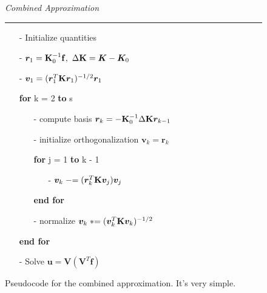 \begin{minipage}[t]{0.7\textwidth}
\begin{figure}[H]
\begin{framed}
    \textit{Combined Approximation}
    \hrule
    \begin{itemize}
        \item[-] Initialize quantities
        \item[-] $\bm r_1 = \mathbf{K}^{-1}_0\mathbf{f}, \ \Delta\mathbf{K} = \bm K - \bm K_0$
        \item[-] $\bm v_1 = (\bm r_1^T\mathbf{K} \bm r_1)^{-1/2}\bm r_1$
        \item[] \textbf{for} k = 2 \textbf{to} s
        \begin{itemize}
            \item[-] compute basis $\bm r_k = -\mathbf{K}^{-1}_0 \Delta\mathbf{K} \bm r_{k - 1}$
            \item[-] initialize orthogonalization $\bm v_k = \bm r_k$
            \item[] \textbf{for} j = 1 \textbf{to} k - 1
            \begin{itemize}
                \item[-] $\bm v_k \mathrel{-}= (\bm r_k^T\mathbf{K} \bm v_j)\bm v_j$
            \end{itemize}
            \item[] \textbf{end for}
            \item[-] normalize $\bm v_k \mathrel{*}= (\bm v_k^T\mathbf{K} \bm v_k)^{-1/2}$
        \end{itemize}
        \item[] \textbf{end for}
        \item[-] Solve $\bm u = \bm V(\bm V^T \bm f)$
    \end{itemize}

\end{framed}
\label{fig:pseudocodeGS}
\caption{Pseudocode for the combined approximation. It's very simple.}
\end{figure}
\end{minipage}\\

